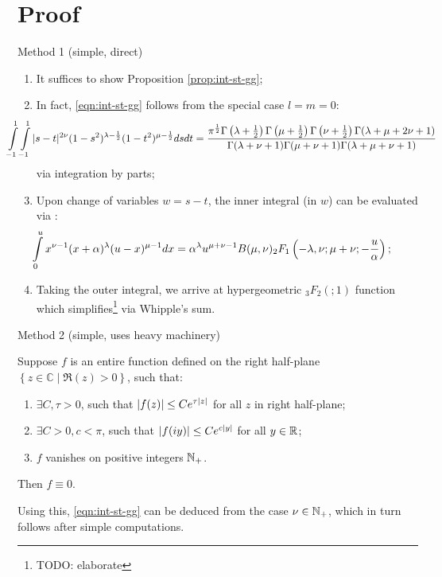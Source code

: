 \documentclass[pdf,notes]{beamer}
\begin{document}
\section{Proof}
\begin{frame}{Method 1 (simple, direct)}
	\begin{enumerate}
		\item It suffices to show Proposition \ref{prop:int-st-gg};
		\item In fact, \eqref{eqn:int-st-gg} follows from the special case $l=m=0$:
			{
				\footnotesize
			\begin{equation*}
				\kern-1cm\int_{- 1}^1 \int_{- 1}^1 | s - t |^{2 \nu} (1 - s^2)^{\lambda - \frac{1}{2}}
				(1 - t^2)^{\mu - \frac{1}{2}} d s d t = \frac{\pi^{\frac{1}{2}} \Gamma \left(
				\lambda + \frac{1}{2} \right) \Gamma \left( \mu + \frac{1}{2} \right) \Gamma
				\left( \nu + \frac{1}{2} \right) \Gamma (\lambda + \mu + 2 \nu + 1)}{\Gamma
				(\lambda + \nu + 1) \Gamma (\mu + \nu + 1) \Gamma (\lambda + \mu + \nu + 1)}
			\end{equation*}
		}
		via integration by parts;
		\item Upon change of variables $w=s-t$, the inner integral (in $w$) can be evaluated via \cite[ET II 186(9)]{gradshteinryzhik}:
		{
		\begin{equation*}
			\kern-1cm\int_0^u x^{\nu - 1} (x + \alpha)^{\lambda} (u - x)^{\mu - 1} d x =
			\alpha^{\lambda} u^{\mu + \nu - 1} B (\mu, \nu)_2 F_1 \left( - \lambda, \nu ;
			\mu + \nu ; - \frac{u}{\alpha} \right);
		\end{equation*}
	}
\item Taking the outer integral, we arrive at hypergeometric $_3F_2(;1)$ function which simplifies\footnote{TODO: elaborate} via Whipple's sum.
	\end{enumerate}
\end{frame}
\begin{frame}{Method 2 (simple, uses heavy machinery)}
	\begin{fact}
		Suppose $f$ is an entire function defined on the right half-plane $\left\{ z\in\mathbb{C}\mid \Re(z)>0 \right\}$, such that:\begin{enumerate}
			\item $\exists C,\tau>0$, such that $\left|f(z)\right|\le C e^{\tau\left|z\right|}$ for all $z$ in right half-plane;
			\item $\exists C>0,c<\pi$, such that $\left|f(iy)\right|\le Ce^{c\left|y\right|}$ for all $y\in\mathbb{R}$;
			\item $f$ vanishes on positive integers $\mathbb{N}_+$.
		\end{enumerate}
		Then $f\equiv0$.
	\end{fact}
	Using this, \eqref{eqn:int-st-gg} can be deduced from the case $\nu\in\mathbb{N}_{+}$, which in turn follows after simple computations.
\end{frame}
\end{document}
